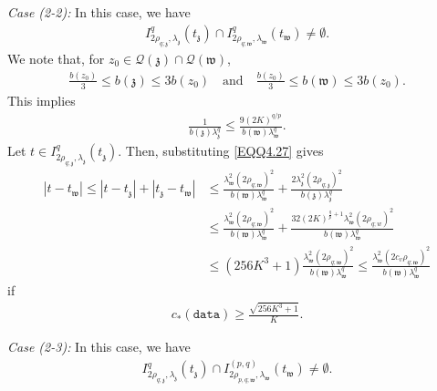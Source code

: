 \documentclass[11pt,oneside, english,reqno,twoside a4paper]{amsart}
\theoremstyle{definition}
\numberwithin{theorem}{section}
\numberwithin{equation}{section}
\newcommand{\mfz}{\mathfrak{z}}
\newcommand{\mfw}{\mathfrak{w}}
\begin{document}
\noindent \textit{Case (2-2):} In this case, we have
\begin{align*}
 I^q_{2\rho_{q;\mathfrak{z}}, \lambda_{\mathfrak{z}}}(t_{\mathfrak{z}})\cap I^q_{2\rho_{q; \mathfrak{w}}, \lambda_{\mathfrak{w}}}(t_{\mathfrak{w}})\neq \emptyset.    
\end{align*}
We note that, for $z_0 \in \mathcal{Q}(\mfz)\cap \mathcal{Q}(\mfw)$,
\begin{align*}
\frac{b(z_0)}{3}\leq b(\mfz)\leq 3b(z_0) \quad \text{and}\quad \frac{b(z_0)}{3}\leq b(\mfw)\leq 3b(z_0).
\end{align*}
This implies 
\begin{align}\label{EQQ4.27}
    \frac{1}{b(\mfz)\lambda^q_{\mfz}}\leq \frac{9(2K)^{q/p}}{b(\mfw)\lambda^q_{\mfw}}.
\end{align}
Let $t \in I^q_{2\rho_{q;\mathfrak{z}}, \lambda_{\mathfrak{z}}}(t_{\mathfrak{z}}).$ Then, substituting \eqref{EQQ4.27} gives
\begin{align*}
    |t-t_{\mathfrak{w}}|\leq |t-t_{\mathfrak{z}}|+|t_{\mathfrak{z}}-t_{\mathfrak{w}}|&\leq \frac{\lambda^{2}_{\mathfrak{w}}(2\rho_{q;\mathfrak{w}})^2}{b(\mathfrak{w})\lambda^q_{\mfw}}+\frac{2\lambda^{2}_{\mathfrak{z}}(2\rho_{q;\mathfrak{z}})^2}{b(\mathfrak{z})\lambda^q_{\mfz}}\\
    &\leq \frac{\lambda^{2}_{\mathfrak{w}}(2\rho_{q;\mathfrak{w}})^2}{b(\mathfrak{w})\lambda^q_{\mfw}}+ \frac{32(2K)^{\frac{q}{p}+1}\lambda^2_{\mfw}(2\rho_{q;w})^2}{b(\mfw)\lambda^q_{\mfw}}\\
    &\leq \left(256K^3+1\right)\frac{\lambda^{2}_{\mathfrak{w}}(2\rho_{q;\mathfrak{w}})^2}{b(\mathfrak{w})\lambda^q_{\mfw}}\leq \frac{\lambda^{2}_{\mathfrak{w}}(2c_v\rho_{q;\mathfrak{w}})^2}{b(\mathfrak{w})\lambda^q_{\mfw}} 
\end{align*}
if
\begin{align}\label{c_5}
    c_*(\texttt{data})\geq \frac{\sqrt{256K^3+1}}{K}.
\end{align}


\noindent \textit{Case (2-3):} In this case, we have
\begin{align*}
 I^q_{2\rho_{q;\mathfrak{z}}, \lambda_{\mathfrak{z}}}(t_{\mathfrak{z}})\cap I^{(p,q)}_{2\rho_{p,q; \mathfrak{w}}, \lambda_{\mathfrak{w}}}(t_{\mathfrak{w}})\neq \emptyset.       
\end{align*}
\end{document}
